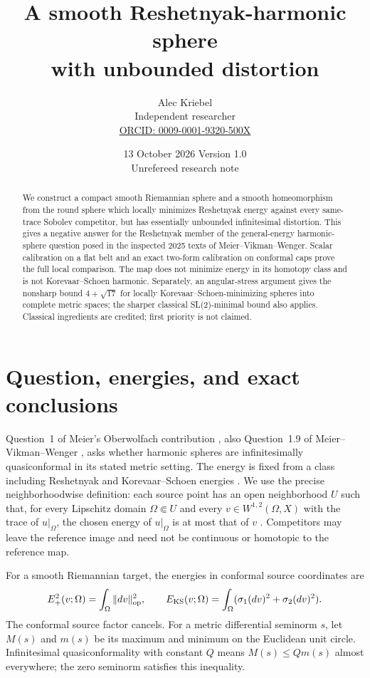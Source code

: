 \documentclass[11pt]{article}
\title{A smooth Reshetnyak-harmonic sphere\\with unbounded distortion}
\author{Alec Kriebel\\\small Independent researcher\\\small\href{https://orcid.org/0009-0001-9320-500X}{ORCID: 0009-0001-9320-500X}}
\date{13 October 2026 \quad Version 1.0\\\small Unrefereed research note}
\newcommand{\Ep}{E_+^2}
\newcommand{\EK}{E_{\rm KS}}
\newcommand{\op}{\operatorname{op}}
\begin{document}
\maketitle
\begin{abstract}
We construct a compact smooth Riemannian sphere and a smooth homeomorphism
from the round sphere which locally minimizes Reshetnyak energy against every
same-trace Sobolev competitor, but has essentially unbounded infinitesimal
distortion. This gives a negative answer for the Reshetnyak member of the
general-energy harmonic-sphere question posed in the inspected 2025 texts of
Meier--Vikman--Wenger. Scalar calibration on a flat belt and an exact two-form
calibration on conformal caps prove the full local comparison. The map does
not minimize energy in its homotopy class and is not Korevaar--Schoen harmonic.
Separately, an angular-stress argument gives the nonsharp bound
$4+\sqrt{17}$ for locally Korevaar--Schoen-minimizing spheres into complete
metric spaces; the sharper classical SL(2)-minimal bound also applies.
Classical ingredients are credited; first priority is not claimed.
\end{abstract}

\section{Question, energies, and exact conclusions}
Question~1 of Meier's Oberwolfach contribution \cite[p.~1625]{owr}, also
Question~1.9 of Meier--Vikman--Wenger \cite{mvw}, asks whether harmonic spheres
are infinitesimally quasiconformal in its stated metric setting. The energy is
fixed from a class including Reshetnyak and Korevaar--Schoen energies
\cite[Definition~3.1]{mvw}. We use the precise neighborhoodwise definition:
each source point has an open neighborhood $U$ such that, for every Lipschitz
domain $\Omega\Subset U$ and every $v\in W^{1,2}(\Omega,X)$ with the trace of
$u|_\Omega$, the chosen energy of $u|_\Omega$ is at most that of $v$
\cite[Definition~6.1]{mvw}. Competitors may leave the reference image and need
not be continuous or homotopic to the reference map.

For a smooth Riemannian target, the energies in conformal source coordinates are
\[
 \Ep(v;\Omega)=\int_\Omega\|dv\|_{\op}^2,
 \qquad \EK(v;\Omega)=\int_\Omega(\sigma_1(dv)^2+\sigma_2(dv)^2).
\]
The conformal source factor cancels. For a metric differential seminorm $s$,
let $M(s)$ and $m(s)$ be its maximum and minimum on the Euclidean unit circle.
Infinitesimal quasiconformality with constant $Q$ means
$M(s)\le Qm(s)$ almost everywhere; the zero seminorm satisfies this inequality.
\end{document}
